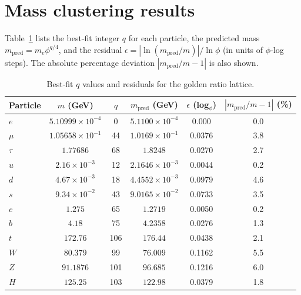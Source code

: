 \documentclass[12pt]{article}
\theoremstyle{definition}
\begin{document}
\section{Mass clustering results}
\label{sec:mass_results}

Table~\ref{tab:masses} lists the best‑fit integer $q$ for each particle, the predicted mass $m_{\text{pred}} = m_e \phi^{q/4}$, and the residual $\epsilon = |\ln(m_{\text{pred}}/m)|/\ln\phi$ (in units of $\phi$‑log steps). The absolute percentage deviation $|m_{\text{pred}}/m - 1|$ is also shown.

\begin{table}[htbp]
\centering
\caption{Best‑fit $q$ values and residuals for the golden ratio lattice.}
\label{tab:masses}
\begin{tabular}{lccccc}
\toprule
Particle & $m$ (GeV) & $q$ & $m_{\text{pred}}$ (GeV) & $\epsilon$ (log$_\phi$) & $|m_{\text{pred}}/m - 1|$ (\%) \\
\midrule
$e$     & $5.10999\times10^{-4}$ & 0    & $5.1100\times10^{-4}$ & 0.000 & 0.0\\
$\mu$   & $1.05658\times10^{-1}$ & 44   & $1.0169\times10^{-1}$ & 0.0376 & 3.8\\
$\tau$  & $1.77686$              & 68   & $1.8248$               & 0.0270 & 2.7\\
$u$     & $2.16\times10^{-3}$    & 12   & $2.1646\times10^{-3}$ & 0.0044 & 0.2\\
$d$     & $4.67\times10^{-3}$    & 18   & $4.4552\times10^{-3}$ & 0.0979 & 4.6\\
$s$     & $9.34\times10^{-2}$    & 43   & $9.0165\times10^{-2}$ & 0.0733 & 3.5\\
$c$     & $1.275$                & 65   & $1.2719$               & 0.0050 & 0.2\\
$b$     & $4.18$                 & 75   & $4.2358$               & 0.0276 & 1.3\\
$t$     & $172.76$               & 106  & $176.44$               & 0.0438 & 2.1\\
$W$     & $80.379$               & 99   & $76.009$               & 0.1162 & 5.5\\
$Z$     & $91.1876$              & 101  & $96.685$               & 0.1216 & 6.0\\
$H$     & $125.25$               & 103  & $122.98$               & 0.0379 & 1.8\\
\bottomrule
\end{tabular}
\end{table}
\end{document}
